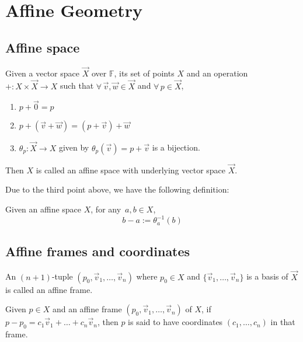 \chapter{Affine Geometry}

\section{Affine space}

\begin{definition}
    Given a vector space $\vec{X}$ over $\mathbb{F}$, its set of points $X$ and
    an operation $+: X\times\vec{X} \to X$ such that $\forall\,\vec{v},\vec{w}\in\vec{X}$
    and $\forall\,p\in\vec{X}$,
    \begin{enumerate}
        \item $p + \vec{0} = p$
        \item $p + (\vec{v} + \vec{w}) = (p + \vec{v}) + \vec{w}$
        \item $\theta_{p} : \vec{X} \to X$ given by
            $\theta_{p}(\vec{v}) = p + \vec{v}$ is a bijection.
    \end{enumerate}
    Then $X$ is called an affine space with underlying vector space $\vec{X}$.
\end{definition}


\noindent
Due to the third point above, we have the following definition:

\begin{definition}
    Given an affine space $X$, for any $\,a,b \in X$,
    \[ b - a := \theta_a^{-1}(b) \]
\end{definition}

\section{Affine frames and coordinates}

\begin{definition}
    An $(n+1)$-tuple $(p_0,\vec{v}_1,\dots,\vec{v}_n)$ where $p_0 \in X$ and
    $\{\vec{v}_1,\dots,\vec{v}_n\}$ is a basis of $\vec{X}$ is called an affine
    frame.
\end{definition}

\noindent
Given $p \in X$ and an affine frame $(p_0,\vec{v}_1,\dots,\vec{v}_n)$ of $X$, if
$p-p_0=c_1\vec{v}_1+\dots+c_n\vec{v}_n$, then $p$ is said to have coordinates
$(c_1,\dots,c_n)$ in that frame.

